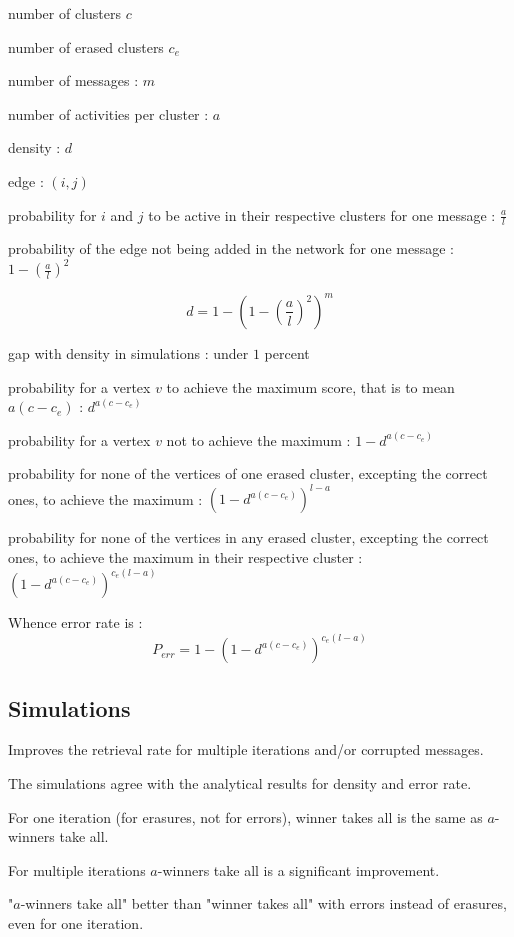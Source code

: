 \documentclass[english,11pt,twocolumn]{article}
\theoremstyle{definition}
\begin{document}
	number of clusters $c$
	
	number of erased clusters $c_e$
	
	number of messages : $m$
	
	number of activities per cluster : $a$
	
	density : $d$

	edge : $(i, j)$
	
	probability for $i$ and $j$ to be active in their respective clusters for one message : $\frac{a}{l}$
	
	probability of the edge	not being added in the network for one message : $1 - \left(\frac{a}{l}\right)^2$
	
			
	\[ d = 1 - \left( 1 - \left(\frac{a}{l}\right)^2 \right)^m \]
	
	gap with density in simulations : under $1$ percent
	
	probability for a vertex $v$ to achieve the maximum score, that is to mean $a(c-c_e)$ : $d^	{a(c-c_e)}$
	
	probability for a vertex $v$	not to achieve the maximum : $1 - d^	{a(c-c_e)}$
	
	probability for none of the vertices of one erased cluster, excepting the correct ones, to achieve the maximum : $\left(1 - d^	{a(c-c_e)}\right)^{l-a}$
	
	probability for none of the vertices in any erased cluster, excepting the correct ones, to achieve the maximum in their respective cluster : $\left(1 - d^	{a(c-c_e)}\right)^{c_e(l-a)}$
	
	Whence error rate is : \[P_{err} = 1 -	\left(1 - d^	{a(c-c_e)}\right)^{c_e(l-a)} \]
	
	
	
	
	
	\subsection{Simulations}
		Improves the retrieval rate for multiple iterations and/or corrupted messages.
		
		The simulations agree with the analytical results for density and error rate.
	

	For one iteration (for erasures, not for errors), winner takes all is the same as $a$-winners take all.
	
	For multiple iterations $a$-winners take all is a significant improvement.
	
		"$a$-winners take all" better than "winner takes all" with errors instead of erasures, even for one iteration.
	
\end{document}
